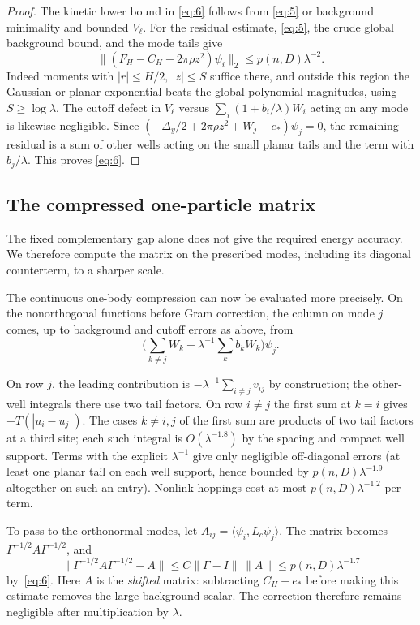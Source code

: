 \begin{proof}
The kinetic lower bound in \eqref{eq:6} follows from \eqref{eq:5} or background minimality and bounded \(V_\ell\). For the residual estimate, \eqref{eq:5}, the crude global background bound, and the mode tails give
\[
  \|(F_H-C_H-2\pi\rho z^2)\psi_i\|_2\le p(n,D)\lambda^{-2}.
\]
Indeed moments with \(|r|\le H/2,\ |z|\le S\) suffice there, and outside this region the Gaussian or planar exponential beats the global polynomial magnitudes, using \(S\ge\log\lambda\). The cutoff defect in \(V_\ell\) versus \(\sum_i(1+b_i/\lambda)W_i\) acting on any mode is likewise negligible. Since \((-{\Delta_y}/2+2\pi\rho z^2+W_j-e_*)\psi_j=0\), the remaining residual is a sum of other wells acting on the small planar tails and the term with \(b_j/\lambda\). This proves \eqref{eq:6}.
\end{proof}

\subsection{The compressed one-particle matrix}

The fixed complementary gap alone does not give the required energy
accuracy. We therefore compute the matrix on the prescribed modes,
including its diagonal counterterm, to a sharper scale.

The continuous one-body compression can now be evaluated more precisely. On the nonorthogonal functions before Gram correction, the column on mode \(j\) comes, up to background and cutoff errors as above, from
\[
                  \Big(\sum_{k\ne j} W_k+\lambda^{-1}\sum_k b_k W_k\Big)\psi_j .
\]


On row \(j\), the leading contribution is \(-\lambda^{-1}\sum_{i\ne j}v_{ij}\) by construction; the other-well integrals there use two tail factors. On row \(i\ne j\) the first sum at \(k=i\) gives \(-T(|u_i-u_j|)\). The cases \(k\ne i,j\) of the first sum are products of two tail factors at a third site; each such integral is \(O(\lambda^{-1.8})\) by the spacing and compact well support. Terms with the explicit \(\lambda^{-1}\) give only negligible off-diagonal errors (at least one planar tail on each well support, hence bounded by \(p(n,D)\lambda^{-1.9}\) altogether on such an entry). Nonlink hoppings cost at most \(p(n,D)\lambda^{-1.2}\) per term. 

To pass to the orthonormal modes, let
\(A_{ij}=\langle\psi_i,L_c\psi_j\rangle\). The matrix becomes
\(\Gamma^{-1/2}A\Gamma^{-1/2}\), and
\[
 \|\Gamma^{-1/2}A\Gamma^{-1/2}-A\|
 \le C\|\Gamma-I\|\,\|A\|
 \le p(n,D)\lambda^{-1.7}
\]
by~\eqref{eq:6}. Here \(A\) is the \emph{shifted} matrix: subtracting
\(C_H+e_*\) before making this estimate removes the large background
scalar. The correction therefore remains negligible after
multiplication by \(\lambda\).

